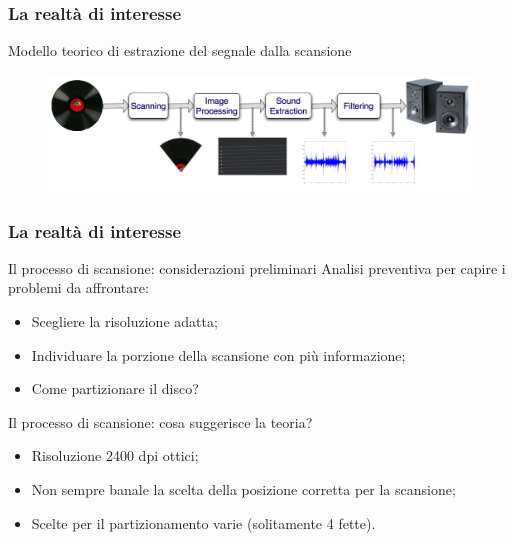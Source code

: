 \begin{frame}
\frametitle{La realtà di interesse}
\begin{block}{Modello teorico di estrazione del segnale dalla scansione}
\begin{figure}
\includegraphics[width=1\textwidth]{immagini/block-scheme.png}
\end{figure}
\end{block}
\end{frame}

\begin{frame}
\frametitle{La realtà di interesse}
\begin{block}{Il processo di scansione: considerazioni preliminari}
Analisi preventiva per capire i problemi da affrontare:
\begin{itemize}
\item Scegliere la risoluzione adatta;
\item Individuare la porzione della scansione con più informazione;
\item Come partizionare il disco?
\end{itemize}
\end{block}


\begin{block}{Il processo di scansione: cosa suggerisce la teoria?}
\begin{itemize}
\item Risoluzione 2400 dpi ottici;
\item Non sempre banale la scelta della posizione corretta per la scansione;
\item Scelte per il partizionamento varie (solitamente 4 fette).
\end{itemize}
\end{block}
\end{frame}

